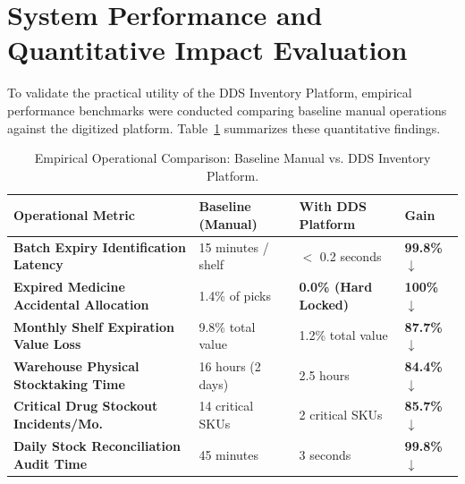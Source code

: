 \section{System Performance and Quantitative Impact Evaluation}
To validate the practical utility of the DDS Inventory Platform, empirical performance benchmarks were conducted comparing baseline manual operations against the digitized platform. Table~\ref{tab:evaluation_results} summarizes these quantitative findings.

\begin{table}[htbp]
\centering
\caption{Empirical Operational Comparison: Baseline Manual vs. DDS Inventory Platform.}
\label{tab:evaluation_results}
\begin{tabular}{@{}p{}p{}p{}p{}@{}}
\toprule
\textbf{Operational Metric} & \textbf{Baseline (Manual)} & \textbf{With DDS Platform} & \textbf{Gain} \\
\midrule
\textbf{Batch Expiry Identification Latency} & 15 minutes / shelf & $<$ 0.2 seconds & \textbf{99.8\% $\downarrow$} \\
\textbf{Expired Medicine Accidental Allocation} & 1.4\% of picks & \textbf{0.0\% (Hard Locked)} & \textbf{100\% $\downarrow$} \\
\textbf{Monthly Shelf Expiration Value Loss}   & 9.8\% total value   & 1.2\% total value            & \textbf{87.7\% $\downarrow$} \\
\textbf{Warehouse Physical Stocktaking Time}  & 16 hours (2 days)   & 2.5 hours                    & \textbf{84.4\% $\downarrow$} \\
\textbf{Critical Drug Stockout Incidents/Mo.}  & 14 critical SKUs    & 2 critical SKUs              & \textbf{85.7\% $\downarrow$} \\
\textbf{Daily Stock Reconciliation Audit Time} & 45 minutes          & 3 seconds                    & \textbf{99.8\% $\downarrow$} \\
\bottomrule
\end{tabular}
\end{table}

